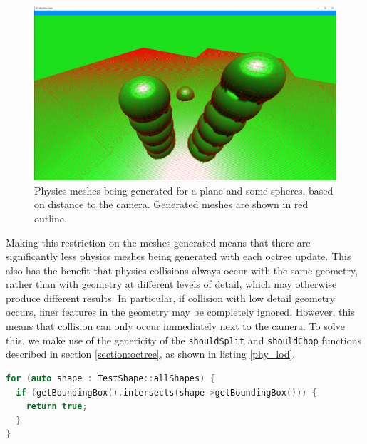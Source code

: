 \documentclass{article}
\begin{document}
\begin{figure}[H]
  \includegraphics[width=\textwidth]{meshes1.png}
  \caption{Physics meshes being generated for a plane and some spheres, based on distance to the camera. Generated meshes are shown in red outline.}
  \label{fig:meshes1}
\end{figure}

Making this restriction on the meshes generated means that there are significantly less physics meshes being generated with each octree update. This also has the benefit that physics collisions always occur with the same geometry, rather than with geometry at different levels of detail, which may otherwise produce different results. In particular, if collision with low detail geometry occurs, finer features in the geometry may be completely ignored. However, this means that collision can only occur immediately next to the camera. To solve this, we make use of the genericity of the \texttt{shouldSplit} and \texttt{shouldChop} functions described in section \ref{section:octree}, as shown in listing \ref{phy_lod}.
\begin{lstlisting}[language=C++,label={phy_lod},caption={Snippet from \texttt{shouldSplit} responsible for increasing the level of detail near a set of test physics objects. All chunks with bounding boxes that intersect the bounding box of a physics shape will be split until the highest detail level is reached. The octree refinement process described in section \ref{section:octree_refinement} ensures that this does not create any places where very different levels of detail are adjacent to each other.}]
for (auto shape : TestShape::allShapes) {
  if (getBoundingBox().intersects(shape->getBoundingBox())) {
    return true;
  }
}
\end{lstlisting}
\end{document}
